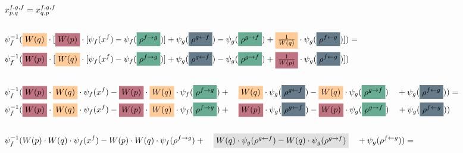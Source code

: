 \documentclass[fleqn]{article}
\begin{document}
	\setlength{\mathindent}{0pt}
	
	\begin{align*}
		&x_{p,q}^{f,g,f} = x_{q,p}^{f,g,f} \\
		\\
		&\psi_{f}^{-1}(\colorbox{lightyellow}{$W(q)$} \cdot [ \colorbox{lightpink}{$W(p)$} \cdot [\psi_{f}(x^{f}) - \psi_{f}(\colorbox{lightgreen}{$\rho^{f\rightarrow g}$})] + \psi_{g}(\colorbox{lightblue}{$\rho^{g\leftarrow f}$})  - \psi_{g}(\colorbox{lightgreen}{$\rho^{g\rightarrow f}$}) + \colorbox{lightyellow}{$\frac{1}{W(q)}$} \cdot \psi_{g}(\colorbox{lightblue}{$\rho^{f\leftarrow g}$})]) = \\
		&\psi_{f}^{-1}(\colorbox{lightpink}{$W(p)$} \cdot [ \colorbox{lightyellow}{$W(q)$} \cdot [\psi_{f}(x^{f}) - \psi_{f}(\colorbox{lightgreen}{$\rho^{f\rightarrow g}$})] + \psi_{g}(\colorbox{lightblue}{$\rho^{g\leftarrow f}$})  - \psi_{g}(\colorbox{lightgreen}{$\rho^{g\rightarrow f}$}) + \colorbox{lightpink}{$\frac{1}{W(p)}$} \cdot \psi_{g}(\colorbox{lightblue}{$\rho^{f\leftarrow g}$})])\\
		\\
		&\psi_{f}^{-1}(\colorbox{lightpink}{$W(p)$} \cdot \colorbox{lightyellow}{$W(q)$} \cdot \psi_{f}(x^{f}) -  \colorbox{lightpink}{$W(p)$} \cdot \colorbox{lightyellow}{$W(q)$} \cdot \psi_{f}(\colorbox{lightgreen}{$\rho^{f\rightarrow g}$})  + \quad \colorbox{lightyellow}{$W(q)$} \cdot \psi_{g}(\colorbox{lightblue}{$\rho^{g\leftarrow f}$}) - \colorbox{lightyellow}{$W(q)$} \cdot \psi_{g}(\colorbox{lightgreen}{$\rho^{g\rightarrow f}$}) \quad + \psi_{g}(\colorbox{lightblue}{$\rho^{f\leftarrow g}$})) = \\
		&\psi_{f}^{-1}(\colorbox{lightpink}{$W(p)$} \cdot \colorbox{lightyellow}{$W(q)$} \cdot \psi_{f}(x^{f}) - \colorbox{lightpink}{$W(p)$} \cdot \colorbox{lightyellow}{$W(q)$} \cdot \psi_{f}(\colorbox{lightgreen}{$\rho^{f\rightarrow g}$})  +  \quad\colorbox{lightpink}{$W(p)$} \cdot \psi_{g}(\colorbox{lightblue}{$\rho^{g\leftarrow f}$}) - \colorbox{lightpink}{$W(p)$} \cdot \psi_{g}(\colorbox{lightgreen}{$\rho^{g\rightarrow f}$}) \quad + \psi_{g}(\colorbox{lightblue}{$\rho^{f\leftarrow g}$}))\\
		\\
		&\psi_{f}^{-1}(W(p) \cdot W(q) \cdot \psi_{f}(x^{f}) - W(p) \cdot W(q) \cdot \psi_{f}(\rho^{f\rightarrow g}) + \quad  \colorbox{lightgray}{$W(q) \cdot \psi_{g}(\rho^{g\leftarrow f}) - W(q) \cdot \psi_{g}(\rho^{g\rightarrow f})$} \quad+ \psi_{g}(\rho^{f\leftarrow g})) = \\ 

\end{align*}
\end{document}
